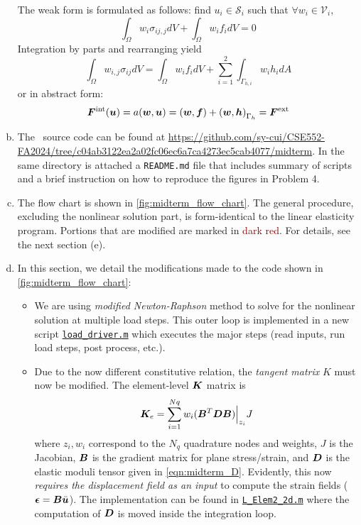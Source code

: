 \begin{enumerate}[(a)]
{The weak form is formulated as follows: find $u_i \in \mathcal{S}_i$ such that $\forall w_i \in \mathcal{V}_i$, 
\begin{equation}
    \int_\Omega w_i \sigma_{ij,j} dV + \int_\Omega w_i f_i dV = 0
\end{equation}
Integration by parts and rearranging yield 
\begin{equation}
    \int_\Omega w_{i,j} \sigma_{ij} dV = \int_\Omega w_i f_i dV + \sum_{i=1}^2 \int_{\Gamma_{h,i}} w_i h_i dA
\end{equation}
or in abstract form:
\begin{equation}
    \bm{F}^{\textrm{int}}(\bm{u}) = a(\bm{w}, \bm{u}) = (\bm{w}, \bm{f}) + {(\bm{w}, \bm{h})}_{\Gamma_{h}} = \bm{F}^{\textrm{ext}}
\end{equation}
}
\item { %
The \matlab~source code can be found at \url{https://github.com/sy-cui/CSE552-FA2024/tree/c04ab3122ea2a02fc06ec6a7ca4273ec5cab4077/midterm}.
In the same directory is attached a \texttt{README.md} file that includes summary of scripts and a brief instruction on how to reproduce the figures in Problem 4. 
}
\item { %
The flow chart is shown in \cref{fig:midterm_flow_chart}.
The general procedure, excluding the nonlinear solution part, is form-identical to the linear elasticity program. 
Portions that are modified are marked in \textcolor{Maroon}{dark red}.
For details, see the next section (e).
}
\item { %
In this section, we detail the modifications made to the code shown in \cref{fig:midterm_flow_chart}:
\begin{itemize}
    \item {
        We are using \emph{modified Newton-Raphson} method to solve for the nonlinear solution at multiple load steps. This outer loop is implemented in a new script \href{https://github.com/sy-cui/CSE552-FA2024/blob/c04ab3122ea2a02fc06ec6a7ca4273ec5cab4077/midterm/load_driver.m}{\texttt{load\_driver.m}} which executes the major steps (read inputs, run load steps, post process, etc.).
    }
    \item {
        Due to the now different constitutive relation, the \emph{tangent matrix} $K$ must now be modified. 
        The element-level $\bm{K}$ matrix is 
        \begin{equation}
            \bm{K}_e = \sum_{i=1}^{Nq} w_i (\bm{B}^T \bm{D} \bm{B})\Big|_{z_i}J
        \end{equation}
        where $z_i, w_i$ correspond to the $N_q$ quadrature nodes and weights, $J$ is the Jacobian, $\bm{B}$ is the gradient matrix for plane stress/strain, and $\bm{D}$ is the elastic moduli tensor given in \cref{eqn:midterm_D}.
        Evidently, this now \emph{requires the displacement field as an input} to compute the strain fields ($\bm{\epsilon} = \bm{B}\bar{\bm{u}}$). 
        The implementation can be found in \href{https://github.com/sy-cui/CSE552-FA2024/blob/c04ab3122ea2a02fc06ec6a7ca4273ec5cab4077/midterm/L_Elem2_2d.m}{\texttt{L\_Elem2\_2d.m}} where the computation of $\bm{D}$ is moved inside the integration loop.  
        
}
\end{itemize}}
\end{enumerate}
